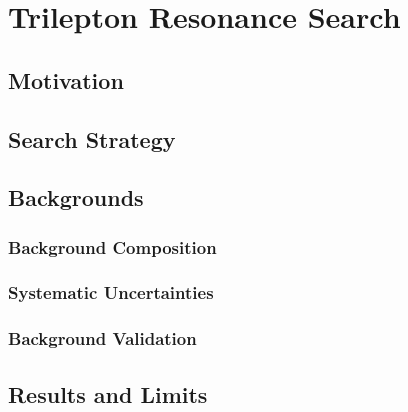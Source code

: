 \chapter{Trilepton Resonance Search}\label{ch:trilepton-resonance-search}

\section{Motivation}

\section{Search Strategy}

\section{Backgrounds}
\subsection{Background Composition}

\subsection{Systematic Uncertainties}

\subsection{Background Validation}


\section{Results and Limits}